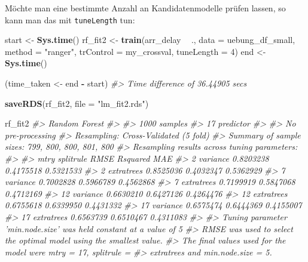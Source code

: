 \documentclass[]{article}
\newenvironment{Shaded}{\begin{snugshade}}{\end{snugshade}}
\newcommand{\CommentTok}[1]{\textcolor[rgb]{0.56,0.35,0.01}{\textit{#1}}}
\newcommand{\DataTypeTok}[1]{\textcolor[rgb]{0.13,0.29,0.53}{#1}}
\newcommand{\DecValTok}[1]{\textcolor[rgb]{0.00,0.00,0.81}{#1}}
\newcommand{\KeywordTok}[1]{\textcolor[rgb]{0.13,0.29,0.53}{\textbf{#1}}}
\newcommand{\NormalTok}[1]{#1}
\newcommand{\OperatorTok}[1]{\textcolor[rgb]{0.81,0.36,0.00}{\textbf{#1}}}
\newcommand{\StringTok}[1]{\textcolor[rgb]{0.31,0.60,0.02}{#1}}
\begin{document}
Möchte man eine bestimmte Anzahl an Kandidatenmodelle prüfen lassen, so
kann man das mit \texttt{tuneLength} tun:

\begin{Shaded}
\begin{Highlighting}[]
\NormalTok{start <-}\StringTok{ }\KeywordTok{Sys.time}\NormalTok{()}
\NormalTok{rf_fit2 <-}\StringTok{ }\KeywordTok{train}\NormalTok{(arr_delay }\OperatorTok{~}\StringTok{ }\NormalTok{.,}
                 \DataTypeTok{data =}\NormalTok{ uebung_df_small,}
                 \DataTypeTok{method =} \StringTok{"ranger"}\NormalTok{,}
                 \DataTypeTok{trControl =}\NormalTok{ my_crossval,}
                 \DataTypeTok{tuneLength =} \DecValTok{4}\NormalTok{)}
\NormalTok{end <-}\StringTok{ }\KeywordTok{Sys.time}\NormalTok{()}


\NormalTok{(time_taken <-}\StringTok{ }\NormalTok{end }\OperatorTok{-}\StringTok{ }\NormalTok{start)}
\CommentTok{#> Time difference of 36.44905 secs}

\KeywordTok{saveRDS}\NormalTok{(rf_fit2, }\DataTypeTok{file =} \StringTok{"lm_fit2.rds"}\NormalTok{)}
\end{Highlighting}
\end{Shaded}

\begin{Shaded}
\begin{Highlighting}[]
\NormalTok{rf_fit2}
\CommentTok{#> Random Forest }
\CommentTok{#> }
\CommentTok{#> 1000 samples}
\CommentTok{#>   17 predictor}
\CommentTok{#> }
\CommentTok{#> No pre-processing}
\CommentTok{#> Resampling: Cross-Validated (5 fold) }
\CommentTok{#> Summary of sample sizes: 799, 800, 800, 801, 800 }
\CommentTok{#> Resampling results across tuning parameters:}
\CommentTok{#> }
\CommentTok{#>   mtry  splitrule   RMSE       Rsquared   MAE      }
\CommentTok{#>    2    variance    0.8203238  0.4175518  0.5321533}
\CommentTok{#>    2    extratrees  0.8525036  0.4032347  0.5362929}
\CommentTok{#>    7    variance    0.7002828  0.5966789  0.4562868}
\CommentTok{#>    7    extratrees  0.7199919  0.5847068  0.4712169}
\CommentTok{#>   12    variance    0.6630210  0.6427126  0.4264476}
\CommentTok{#>   12    extratrees  0.6755618  0.6339950  0.4431332}
\CommentTok{#>   17    variance    0.6575474  0.6444369  0.4155007}
\CommentTok{#>   17    extratrees  0.6563739  0.6510467  0.4311083}
\CommentTok{#> }
\CommentTok{#> Tuning parameter 'min.node.size' was held constant at a value of 5}
\CommentTok{#> RMSE was used to select the optimal model using the smallest value.}
\CommentTok{#> The final values used for the model were mtry = 17, splitrule =}
\CommentTok{#>  extratrees and min.node.size = 5.}
\end{Highlighting}
\end{Shaded}
\end{document}
